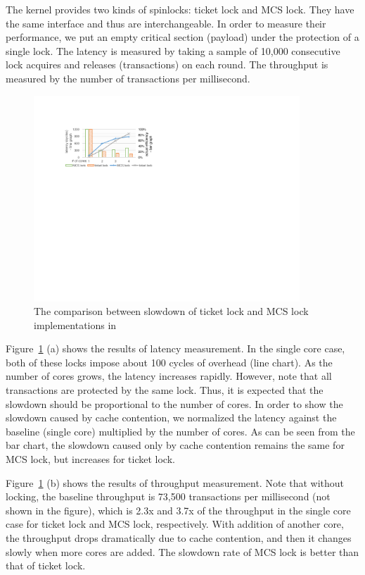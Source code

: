 The {\cCTOS} kernel provides two kinds of spinlocks: ticket lock and MCS lock. They
have the same interface and thus are interchangeable. In order to measure
their performance, we put an empty critical section (payload) under the
protection of a single lock. The latency is measured by taking a sample of 10,000
consecutive lock acquires and releases (transactions) on each round. The
throughput is measured by the number of transactions per millisecond.

\begin{figure}\centering
	\hspace{-.2cm}
	\includegraphics[width=10cm]{figs/locks.pdf}
	\hspace{-.2cm}
	\caption{The comparison between slowdown of ticket lock and MCS lock implementations in \cCTOS{}}
	\label{fig:locks}
	\hrulefill
\end{figure}

Figure~\ref{fig:locks} (a) shows the results of latency measurement. In the
single core case, both of these locks impose about 100 cycles of overhead (line chart). 
As the number of cores grows, the latency increases rapidly. However, note
that all transactions are protected by the same lock. Thus, it is expected that
the slowdown should be proportional to the number of cores. In order to show the
slowdown caused by cache contention, we normalized the latency against the
baseline (single core) multiplied by the number of cores. As can be seen from 
the bar chart, the slowdown caused only by cache
contention remains the same for MCS lock, but increases for ticket lock.

Figure~\ref{fig:locks} (b) shows the results of throughput measurement.
Note that without locking, the baseline throughput is 73,500 transactions per millisecond
(not shown in the figure), which is
2.3x and 3.7x of the throughput in the single core case for ticket lock and MCS lock,
respectively. With addition of another core, the throughput drops dramatically
due to cache contention, and then it changes slowly when more cores are added.
The slowdown rate of MCS lock is better than that of ticket lock.

